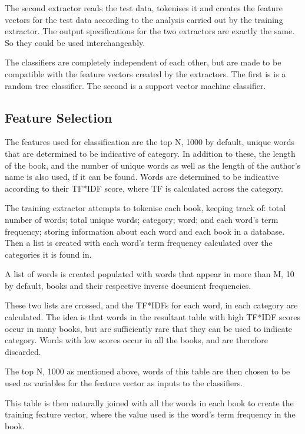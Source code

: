 \documentclass[11pt]{article}
\begin{document}
The second extractor reads the test data, tokenises it and creates the feature
vectors for the test data according to the analysis carried out by the training
extractor. The output specifications for the two extractors are exactly the
same. So they could be used interchangeably.

The classifiers are completely independent of each other, but are made to be
compatible with the feature vectors created by the extractors. The first is is a
random tree classifier. The second is a support vector machine classifier.

\subsection{Feature Selection}

The features used for classification are the top N, 1000 by default, unique
words that are determined to be indicative of category. In addition to these,
the length of the book, and the number of unique words as well as the length of
the author's name is also used, if it can be found.  Words are determined to be
indicative according to their TF*IDF score, where TF is calculated across the
category.

The training extractor attempts to tokenise each book, keeping track of: total
number of words; total unique words; category; word; and each word's term
frequency; storing information about each word and each book in a database.
Then a list is created with each word's term frequency calculated over the
categories it is found in.

A list of words is created populated with words that appear in more than M, 10
by default, books and their respective inverse document frequencies. 

These two lists are crossed, and the TF*IDFs for each word, in each category are
calculated. The idea is that words in the resultant table with high TF*IDF
scores occur in many books, but are sufficiently rare that they can be used to
indicate category. Words with low scores occur in all the books, and are
therefore discarded.

The top N, 1000 as mentioned above, words of this table are then chosen
to be used as variables for the feature vector as inputs to the classifiers.

This table is then naturally joined with all the words in each book to create
the training feature vector, where the value used is the word's term frequency
in the book. 
\end{document}
